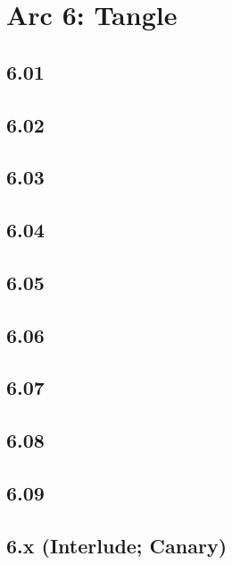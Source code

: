 \part*{Arc 6: Tangle}
 \chapter*{6.01}
 \chapter*{6.02}
 \chapter*{6.03}
 \chapter*{6.04}
 \chapter*{6.05}
 \chapter*{6.06}
 \chapter*{6.07}
 \chapter*{6.08}
 \chapter*{6.09}
 \chapter*{6.x (Interlude; Canary)}











